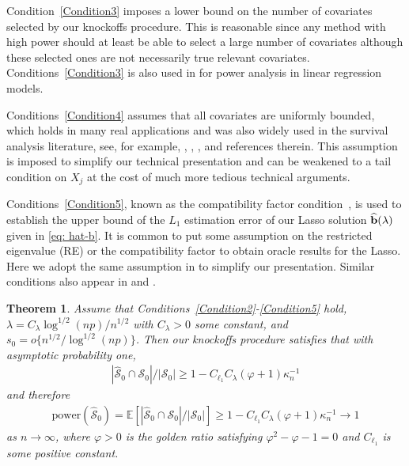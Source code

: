 \documentclass[11pt]{article}
\newtheorem{theorem}{Theorem}%
\def\bb{{\bf b}}
\begin{document}
Condition~\ref{Condition3} imposes a lower bound on the number of covariates selected by our knockoffs procedure. This is reasonable since any method with
high power should at least be able to select a large number of
covariates although these selected ones are not necessarily true relevant covariates. 
Conditions~\ref{Condition3} is also used in
\cite{fan2020rank} for power analysis in linear regression models.


Conditions~\ref{Condition4} assumes that all covariates are uniformly bounded, which holds in many real applications and 
was also widely used in the survival analysis literature, see, for example, \cite{bradic2011regularization}, \cite{fang2017testing}, \cite{yu2021confidence},  
and references therein. This assumption
is imposed to simplify our technical presentation and 
can be weakened to a  
tail condition on $X_j$ at the cost of much more tedious technical arguments. 


Conditions~\ref{Condition5}, known as the compatibility factor condition~\citep{van2009conditions},  
is used to establish the upper bound of the $L_1$ estimation error of our Lasso solution $\widehat{\bb}(\lambda)$ given in \eqref{eq: hat-b}.  
It is common to put some assumption on the restricted eigenvalue (RE) or the compatibility factor to obtain oracle results for the Lasso. Here we adopt the same assumption in \cite{yu2021confidence} to simplify our presentation. Similar conditions also appear in
\cite{huang2013oracle} and \cite{fang2017testing}.



\begin{theorem}\label{Theorem2}
	Assume that  Conditions~\ref{Condition2}-\ref{Condition5} hold, $\lambda=C_{\lambda}\log^{1/2}(np) /n^{1/2}$ with $C_{\lambda}>0$ some constant, and $s_{0}={o}\{n^{1/2}/\log^{1/2} (n p)\}$. Then our knockoffs procedure satisfies that with
	asymptotic probability one,
	\begin{align}\label{eq: TDR-bound}
	|\widehat{\mathcal{S}}_0 \cap \mathcal{S}_0|/|\mathcal{S}_0|
	\geq 
	1-C_{\ell_1}C_{\lambda}(\varphi+1)\kappa_n^{-1}
	\end{align}
	and therefore
	\begin{align}\label{eq: power-bound}
	\mathrm{power}(\widehat{\mathcal{S}}_0 )=\mathbb{E}\left[|\widehat{\mathcal{S}}_0 \cap \mathcal{S}_0|/|\mathcal{S}_0|\right]
	\geq 
	1-C_{\ell_1}C_{\lambda}(\varphi+1)\kappa_n^{-1}
	\to 1
	\end{align}
	as $n\to\infty$, where $\varphi>0$ is the golden ratio satisfying $\varphi^2-\varphi-1=0$ and $C_{\ell_1}$ is some positive constant.  
\end{theorem}            
\end{document}
